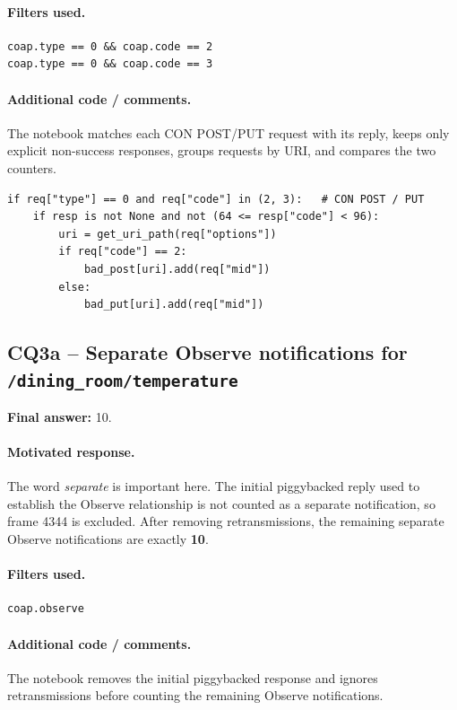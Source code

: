 \documentclass[11pt,a4paper]{article}
\begin{document}
\paragraph{Filters used.}
\begin{verbatim}
coap.type == 0 && coap.code == 2
coap.type == 0 && coap.code == 3
\end{verbatim}

\paragraph{Additional code / comments.}
The notebook matches each CON POST/PUT request with its reply, keeps only explicit
non-success responses, groups requests by URI, and compares the two counters.

\begin{verbatim}
if req["type"] == 0 and req["code"] in (2, 3):   # CON POST / PUT
    if resp is not None and not (64 <= resp["code"] < 96):
        uri = get_uri_path(req["options"])
        if req["code"] == 2:
            bad_post[uri].add(req["mid"])
        else:
            bad_put[uri].add(req["mid"])
\end{verbatim}
\subsection*{CQ3a -- Separate Observe notifications for \texttt{/dining\_room/temperature}}

\textbf{Final answer:} 10.

\paragraph{Motivated response.}
The word \emph{separate} is important here. The initial piggybacked reply used to establish the
Observe relationship is not counted as a separate notification, so frame 4344 is excluded.
After removing retransmissions, the remaining separate Observe notifications are exactly
\textbf{10}.

\paragraph{Filters used.}
\begin{verbatim}
coap.observe
\end{verbatim}

\paragraph{Additional code / comments.}
The notebook removes the initial piggybacked response and ignores retransmissions before
counting the remaining Observe notifications.
\end{document}
